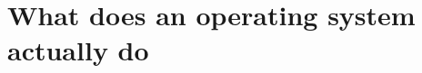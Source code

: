 \chapter{What does an operating system actually do}
\label{ch:what-does-an-operating-system-actually}

